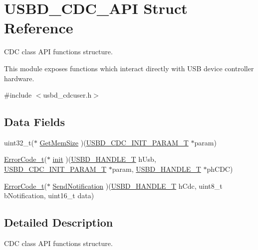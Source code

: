 \hypertarget{structUSBD__CDC__API}{\section{U\-S\-B\-D\-\_\-\-C\-D\-C\-\_\-\-A\-P\-I Struct Reference}
\label{structUSBD__CDC__API}
}


C\-D\-C class A\-P\-I functions structure.

This module exposes functions which interact directly with U\-S\-B device controller hardware.  




{\ttfamily \#include $<$usbd\-\_\-cdcuser.\-h$>$}

\subsection*{Data Fields}
\begin{DoxyCompactItemize}
\item 
uint32\-\_\-t($\ast$ \hyperlink{structUSBD__CDC__API_abde21c25f0b02b4d3ec9af0e41378437}{Get\-Mem\-Size} )(\hyperlink{group__USBD__CDC_ga78b2c5f20653181161c59062795233b3}{U\-S\-B\-D\-\_\-\-C\-D\-C\-\_\-\-I\-N\-I\-T\-\_\-\-P\-A\-R\-A\-M\-\_\-\-T} $\ast$param)
\item 
\hyperlink{error_8h_a905255056c349318139d94aa4523d516}{Error\-Code\-\_\-t}($\ast$ \hyperlink{structUSBD__CDC__API_a3c3f8725643c607bca1cf3f422dc5702}{init} )(\hyperlink{group__USBD__Core_gafdbb2204d929cb9d75736bd2b42342ac}{U\-S\-B\-D\-\_\-\-H\-A\-N\-D\-L\-E\-\_\-\-T} h\-Usb, \hyperlink{group__USBD__CDC_ga78b2c5f20653181161c59062795233b3}{U\-S\-B\-D\-\_\-\-C\-D\-C\-\_\-\-I\-N\-I\-T\-\_\-\-P\-A\-R\-A\-M\-\_\-\-T} $\ast$param, \hyperlink{group__USBD__Core_gafdbb2204d929cb9d75736bd2b42342ac}{U\-S\-B\-D\-\_\-\-H\-A\-N\-D\-L\-E\-\_\-\-T} $\ast$ph\-C\-D\-C)
\item 
\hyperlink{error_8h_a905255056c349318139d94aa4523d516}{Error\-Code\-\_\-t}($\ast$ \hyperlink{structUSBD__CDC__API_a39f1af8073c7e98a7a96ac68e612e7fe}{Send\-Notification} )(\hyperlink{group__USBD__Core_gafdbb2204d929cb9d75736bd2b42342ac}{U\-S\-B\-D\-\_\-\-H\-A\-N\-D\-L\-E\-\_\-\-T} h\-Cdc, uint8\-\_\-t b\-Notification, uint16\-\_\-t data)
\end{DoxyCompactItemize}


\subsection{Detailed Description}
C\-D\-C class A\-P\-I functions structure.

